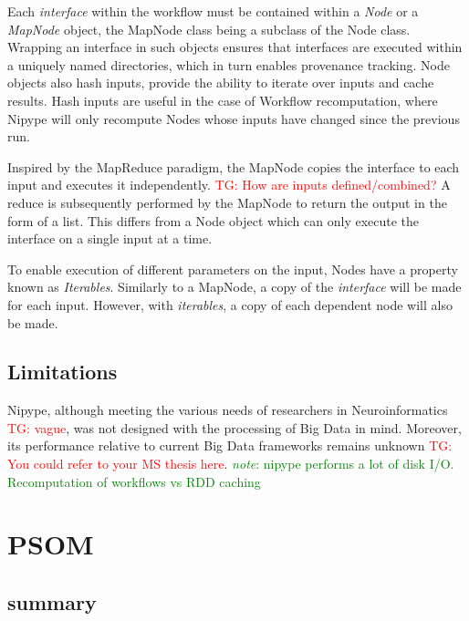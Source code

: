 \documentclass{report}
\newcommand{\note}[1]{\textcolor{green}{\textit{note}: #1}}
\newcommand{\tristan}[1]{\textcolor{red}{TG: #1}}
\begin{document}
		 Each \textit{interface} within the workflow must be
                 contained within a \textit{Node} or a
                 \textit{MapNode} object, the MapNode class being a
                 subclass of the Node class. Wrapping an interface in
                 such objects ensures that interfaces are executed
                 within a uniquely named directories, which in turn
                 enables provenance tracking. Node objects also hash
                 inputs, provide the ability to iterate over inputs
                 and cache results. Hash inputs are useful in the case
                 of Workflow recomputation, where Nipype will only
                 recompute Nodes whose inputs have changed since the
                 previous run.
		
		Inspired by the MapReduce paradigm, the MapNode copies
                the interface to each input and executes it
                independently. \tristan{How are inputs defined/combined?} A reduce is subsequently performed by
                the MapNode to return the output in the form of a
                list. This differs from a Node object which can only
                execute the interface on a single input at a time.
		
		To enable execution of different parameters on the
                input, Nodes have a property known as
                \textit{Iterables}. Similarly to a MapNode, a copy of
                the \textit{interface} will be made for each
                input. However, with \textit{iterables}, a copy of
                each dependent node will also be made.
		 
		\subsection{Limitations}
		Nipype, although meeting the various needs of
                researchers in Neuroinformatics \tristan{vague}, was
                not designed with the processing of Big Data in
                mind. Moreover, its performance relative to current
                Big Data frameworks remains unknown \tristan{You could
                  refer to your MS thesis here}.  \note{nipype
                  performs a lot of disk I/O. Recomputation of
                  workflows vs RDD caching}
		
	\section{PSOM}
		\subsection{summary}
\end{document}
